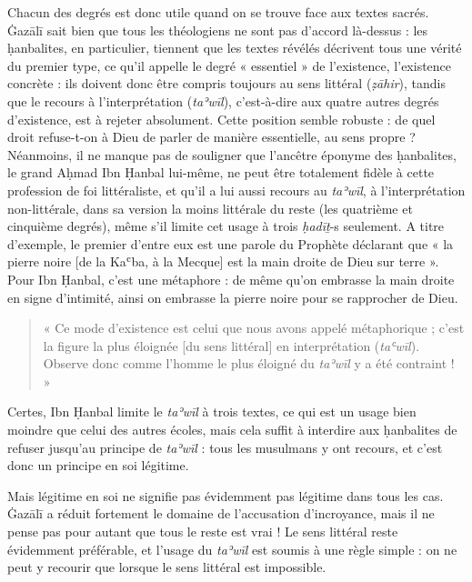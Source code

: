 Chacun des degrés est donc utile quand on se trouve face aux textes
sacrés. Ġazālī sait
bien que tous les théologiens ne sont pas d'accord là-dessus : les
ḥanbalites, en particulier,
tiennent que les textes révélés décrivent tous une vérité du premier
type, ce qu'il appelle le degré « essentiel » de l'existence,
l'existence concrète : ils doivent donc être compris toujours au sens
littéral (\emph{ẓāhir}), tandis que le recours à l'interprétation
(\emph{taʾwīl}), c'est-à-dire aux quatre autres degrés d'existence, est
à rejeter absolument. Cette position semble robuste : de quel droit
refuse-t-on à Dieu de parler de manière essentielle, au sens propre ?
Néanmoins, il ne manque pas de souligner que l'ancêtre éponyme des
ḥanbalites, le grand Aḥmad Ibn Ḥanbal lui-même, ne peut être totalement
fidèle à cette profession de foi littéraliste, et qu'il a lui aussi
recours au \emph{taʾwīl}, à l'interprétation non-littérale, dans sa
version la moins littérale du reste (les quatrième et cinquième degrés),
même s'il limite cet usage à trois \emph{ḥadīṯ}-s seulement. A titre
d'exemple, le premier d'entre eux est une parole du Prophète déclarant
que « la pierre noire {[}de la Kaʿba, à la Mecque{]} est la main droite
de Dieu sur terre ». Pour Ibn Ḥanbal, c'est une métaphore : de même
qu'on embrasse la main droite en signe d'intimité, ainsi on embrasse la
pierre noire pour se rapprocher de Dieu. \begin{quote}
    « Ce mode d'existence est celui
que nous avons appelé métaphorique ; c'est la figure la plus éloignée
{[}du sens littéral{]} en interprétation (\emph{taʿwīl}). Observe donc
comme l'homme le plus éloigné du \emph{taʾwīl} y a été contraint ! »
\end{quote}
\begin{Prop}
Certes, Ibn Ḥanbal limite le \emph{taʾwīl} à trois textes, ce qui est un
usage bien moindre que celui des autres écoles, mais cela suffit à
interdire aux ḥanbalites de refuser jusqu'au principe de \emph{taʾwīl} :
tous les musulmans y ont recours, et c'est donc un principe en soi
légitime.
\end{Prop}


Mais légitime en soi ne signifie pas évidemment pas légitime dans tous
les cas. Ġazālī a réduit fortement le domaine de l'accusation
d'incroyance, mais il ne pense pas pour autant que tous le reste est
vrai ! Le sens littéral reste évidemment préférable, et l'usage du
\emph{taʾwīl} est soumis à une règle simple : on ne peut y recourir que
lorsque le sens littéral est impossible.

